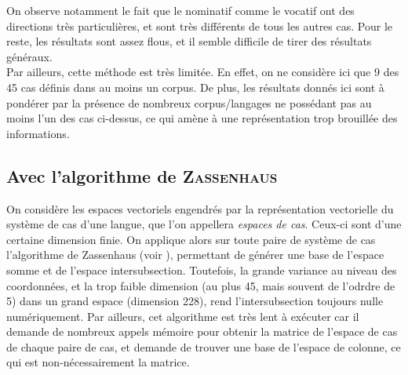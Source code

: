 \documentclass{article}
\begin{document}
On observe notamment le fait que le nominatif comme le vocatif ont des directions très particulières, et sont très différents de tous les autres cas. Pour le reste, les résultats sont assez flous, et il semble difficile de tirer des résultats généraux.\\
\medskip
Par ailleurs, cette méthode est très limitée. En effet, on ne considère ici que 9 des 45 cas définis dans au moins un corpus.
De plus, les résultats donnés ici sont à pondérer par la présence de nombreux corpus/langages ne possédant pas au moins l'un des cas ci-dessus, ce qui amène à une représentation trop brouillée des informations.


\subsection{Avec l'algorithme de \textsc{Zassenhaus}}\label{subsec:zassenhaus}
On considère les espaces vectoriels engendrés par la représentation vectorielle du système de cas d'une langue, que l'on appellera \textit{espaces de cas}.
Ceux-ci sont d'une certaine dimension finie.
On applique alors sur toute paire de système de cas l'algorithme de Zassenhaus (voir \cite{zassenhaus}), permettant de générer une base de l'espace somme et de l'espace intersubsection.
Toutefois, la grande variance au niveau des coordonnées, et la trop faible dimension (au plus 45, mais souvent de l'odrdre de 5) dans un grand espace (dimension 228), rend l'intersubsection toujours nulle numériquement.
Par ailleurs, cet algorithme est très lent à exécuter car il demande de nombreux appels mémoire pour obtenir la matrice de l'espace de cas de chaque paire de cas, et demande de trouver une base de l'espace de colonne, ce qui est non-nécessairement la matrice.
\end{document}
